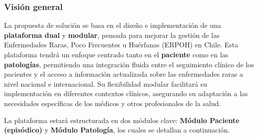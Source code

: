 \documentclass{article}
\begin{document}
\subsubsection*{Visión general}

La propuesta de solución se basa en el diseño e implementación de una \textbf{plataforma dual} y \textbf{modular}, pensada para mejorar la gestión de las Enfermedades Raras, Poco Frecuentes u Huérfanas (ERPOH) en Chile. Esta plataforma tendrá un enfoque centrado tanto en el \textbf{paciente} como en las \textbf{patologías}, permitiendo una integración fluida entre el seguimiento clínico de los pacientes y el acceso a información actualizada sobre las enfermedades raras a nivel nacional e internacional. Su flexibilidad modular facilitará su implementación en diferentes contextos clínicos, asegurando su adaptación a las necesidades específicas de los médicos y otros profesionales de la salud.

La plataforma estará estructurada en dos módulos clave: \textbf{Módulo Paciente (episódico)} y \textbf{Módulo Patología}, los cuales se detallan a continuación.
\end{document}

